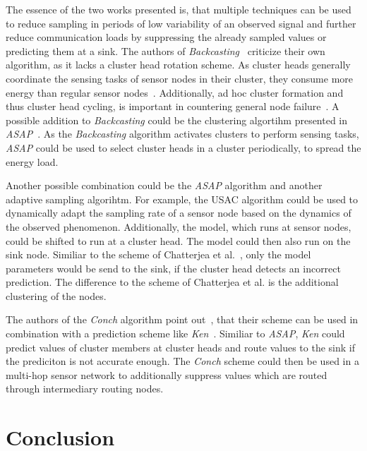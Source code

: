 The essence of the two works presented is, that multiple techniques can be used
to reduce sampling in periods of low variability of an observed signal and
further reduce communication loads by suppressing the already sampled values or
predicting them at a sink. The authors of
\textit{Backcasting}~\cite{willett2004backcasting} criticize their own
algorithm, as it lacks a cluster head rotation scheme. As cluster heads
generally coordinate the sensing tasks of sensor nodes in their cluster, they
consume more energy than regular sensor nodes~\cite{pradhan2016cluster}.
Additionally, ad hoc cluster formation and thus cluster head cycling, is
important in countering general node failure~\cite{hu2018fault}. A possible
addition to \textit{Backcasting} could be the clustering algortihm presented in
\textit{ASAP}~\cite{gedik2007asap}. As the \textit{Backcasting} algorithm
activates clusters to perform sensing tasks, \textit{ASAP} could be used to
select cluster heads in a cluster periodically, to spread the energy load.

Another possible combination could be the \textit{ASAP} algorithm and another
adaptive sampling algorihtm. For example, the \ac{USAC} algorithm could be used
to dynamically adapt the sampling rate of a sensor node based on the dynamics
of the observed phenomenon. Additionally, the model, which runs at sensor
nodes, could be shifted to run at a cluster head. The model could then also run
on the sink node. Similiar to the scheme of Chatterjea et
al.~\cite{chatterjea2008adaptive}, only the model parameters would be send to
the sink, if the cluster head detects an incorrect prediction. The difference
to the scheme of Chatterjea et al. is the additional clustering of the nodes. 

The authors of the \textit{Conch} algorithm point
out~\cite{silberstein2006constraint}, that their scheme can be used in
combination with a prediction scheme like \textit{Ken}~\cite{jain2004adaptive}.
Similiar to \textit{ASAP}, \textit{Ken} could predict values of cluster members
at cluster heads and route values to the sink if the prediciton is not accurate
enough. The \textit{Conch} scheme could then be used in a multi-hop sensor
network to additionally suppress values which are routed through intermediary
routing nodes.

\section{Conclusion}


